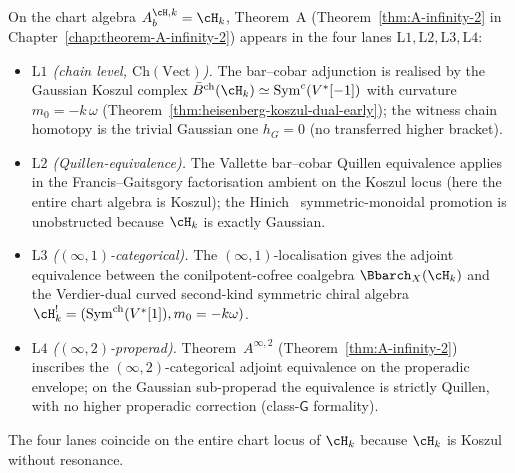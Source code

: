 \begin{remark}
\label{rem:heisenberg-theorem-A-four-lanes}
On the chart algebra $A_b^{\cH,k}=\cH_k$, Theorem~A
(Theorem~\ref{thm:A-infinity-2} in
Chapter~\ref{chap:theorem-A-infinity-2}) appears in the four lanes
$\mathrm{L}1,\mathrm{L}2,\mathrm{L}3,\mathrm{L}4$:
\begin{itemize}
\item \emph{$\mathrm{L}1$ (chain level, $\mathrm{Ch}(\mathrm{Vect})$).}
The bar--cobar adjunction is realised by the Gaussian Koszul complex
$\bar{B}^{\mathrm{ch}}(\cH_k)\simeq
\mathrm{Sym}^c(V^*[-1])$ with curvature $m_0=-k\,\omega$
(Theorem~\ref{thm:heisenberg-koszul-dual-early}); the witness chain
homotopy is the trivial Gaussian one $h_G=0$ (no transferred higher
bracket).
\item \emph{$\mathrm{L}2$ (Quillen-equivalence).}
The Vallette bar--cobar Quillen equivalence
\cite[Theorem~2.1]{Val16} applies in the Francis--Gaitsgory
factorisation ambient on the Koszul locus
(here the entire chart algebra is Koszul);
the Hinich~\cite{Hinich2003} symmetric-monoidal promotion is
unobstructed because $\cH_k$ is exactly Gaussian.
\item \emph{$\mathrm{L}3$ ($(\infty,1)$-categorical).}
The $(\infty,1)$-localisation gives the adjoint equivalence between
the conilpotent-cofree coalgebra $\Bbarch_X(\cH_k)$ and the
Verdier-dual curved second-kind symmetric chiral algebra
$\cH_k^!=(\mathrm{Sym}^{\mathrm{ch}}(V^*[1]),m_0=-k\omega)$.
\item \emph{$\mathrm{L}4$ ($(\infty,2)$-properad).}
Theorem~$A^{\infty,2}$ (Theorem~\ref{thm:A-infinity-2})
inscribes the $(\infty,2)$-categorical adjoint equivalence on the
properadic envelope; on the Gaussian sub-properad the equivalence is
strictly Quillen, with no higher properadic correction
(class-$\mathsf{G}$ formality).
\end{itemize}
The four lanes coincide on the entire chart locus of $\cH_k$
because $\cH_k$ is Koszul without resonance.
\end{remark}

